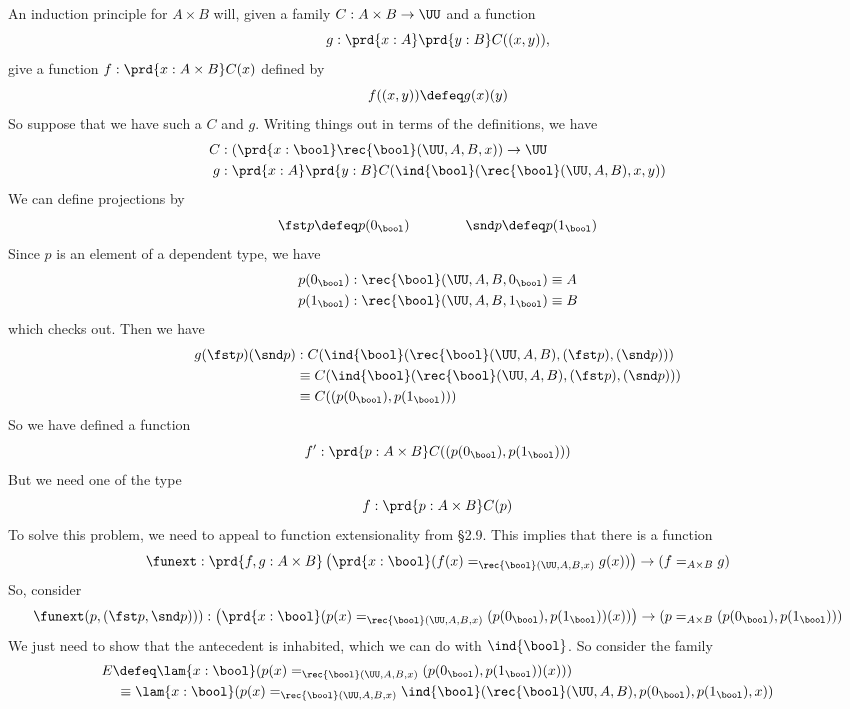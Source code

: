 An induction principle for $A \times B$ will, given a family $C : A \times B
\to \UU$ and a function 
\[
  g : \prd{x:A}\prd{y:B} C((x, y)),
\] 
give a function $f : \prd{x : A \times B}C(x)$ defined by
\[
  f((x, y)) \defeq g(x)(y)
\]
So suppose that we have such a $C$ and $g$.  Writing things out in terms of the
definitions, we have
\begin{align*}
  C &: \left(\prd{x:\bool}\rec{\bool}(\UU, A, B, x)\right) \to \UU \\
  g &: \prd{x:A}\prd{y:B} C(\ind{\bool}(\rec{\bool}(\UU, A, B), x, y))
\end{align*}  
We can define projections by
\[
  \fst p \defeq p(0_{\bool}) \qquad\qquad \snd p \defeq p(1_{\bool})
\]
Since $p$ is an element of a dependent type, we have
\begin{align*}
  p(0_{\bool}) &: \rec{\bool}(\UU, A, B, 0_{\bool}) \equiv A\\
  p(1_{\bool}) &: \rec{\bool}(\UU, A, B, 1_{\bool}) \equiv B
\end{align*}
which checks out.  Then we have
\begin{align*}
  g(\fst p)(\snd p) 
  &: C(\ind{\bool}(\rec{\bool}(\UU, A, B), (\fst p), (\snd p)))
  \\&\equiv 
  C(\ind{\bool}(\rec{\bool}(\UU, A, B), (\fst p), (\snd p)))
  \\&\equiv 
  C((p(0_{\bool}), p(1_{\bool})))
\end{align*}
So we have defined a function
\[
  f' : \prd{p : A \times B} C((p(0_{\bool}), p(1_{\bool})))
\]
But we need one of the type
\[
  f : \prd{p : A \times B} C(p)
\]
To solve this problem, we need to appeal to function extensionality from \S2.9.
This implies that there is a function
\[
  \funext : 
  \prd{f, g : A \times B} 
    \left(\prd{x:\bool} (f(x) =_{\rec{\bool}(\UU, A, B, x)} g(x))\right)
    \to 
    (f =_{A \times B} g)
\]
So, consider
\[
  \funext(p, (\fst p, \snd p))) 
  :
  \left(\prd{x:\bool} (p(x) =_{\rec{\bool}(\UU, A, B, x)} (p(0_{\bool}),
    p(1_{\bool}))(x))\right)
  \to 
  (p =_{A \times B} (p(0_{\bool}), p(1_{\bool})))
\]
We just need to show that the antecedent is inhabited, which we can do with
$\ind{\bool}$.  So consider the family
\begin{align*}
  E &\defeq 
  \lam{x : \bool} 
  (p(x) =_{\rec{\bool}(\UU, A, B, x)} (p(0_{\bool}), p(1_{\bool}))(x)))
  \\&\phantom{:}\equiv
  \lam{x : \bool} 
  (p(x) =_{\rec{\bool}(\UU, A, B, x)} \ind{\bool}(\rec{\bool}(\UU, A, B),
  p(0_{\bool}), p(1_{\bool}), x))
\end{align*}
